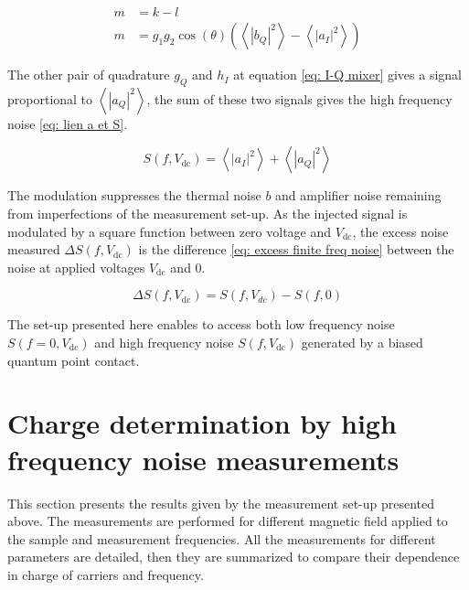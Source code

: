 \begin{align}
	m & = k-l \\
	m & = g_{1}g_{2}\cos\left(\theta\right)\left(\left<\left|b_{Q}\right|^{2}\right>-\left<\left|a_{I}\right|^{2}\right>\right) \label{eq: differential amplifier}
\end{align}

The other pair of quadrature $g_{Q}$ and $h_{I}$ at equation \eqref{eq: I-Q mixer} gives a signal proportional to $\left<\left|a_{Q}\right|^{2}\right>$, the sum of these two signals gives the high frequency noise \eqref{eq: lien a et S}.

\begin{equation}
S\left(f,V_{\mathrm{dc}}\right) = \left<\left|a_{I}\right|^{2}\right> + \left<\left|a_{Q}\right|^{2}\right> \label{eq: lien a et S}
\end{equation}

The modulation suppresses the thermal noise $b$ and amplifier noise remaining from imperfections of the measurement set-up.
As the injected signal is modulated by a square function between zero voltage and $V_{\mathrm{dc}}$, the excess noise measured $\Delta S \left(f,V_{\mathrm{dc}}\right)$ is the difference \eqref{eq: excess finite freq noise} between the noise at applied voltages $V_{\mathrm{dc}}$ and 0.

\begin{equation}
\Delta S \left(f,V_{\mathrm{dc}}\right) = S \left(f,V_{dc}\right)-S \left(f,0\right) \label{eq: excess finite freq noise}
\end{equation}

The set-up presented here enables to access both low frequency noise $S\left(f=0,V_{\mathrm{dc}}\right)$ and high frequency noise $S\left(f,V_{\mathrm{dc}}\right)$ generated by a biased quantum point contact.

\section{\texorpdfstring{Charge determination by high frequency noise measurements}{Charge determination by high frequency noise measurements}}

This section presents the results given by the measurement set-up presented above.
The measurements are performed for different magnetic field applied to the sample and measurement frequencies.
All the measurements for different parameters are detailed, then they are summarized to compare their dependence in charge of carriers and frequency.

